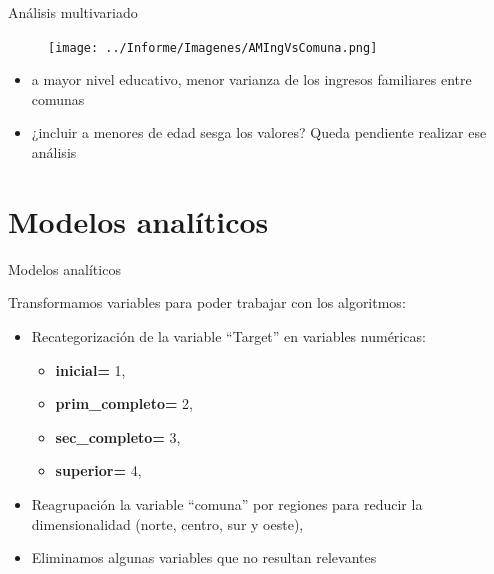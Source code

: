\documentclass[pdf]{beamer}
\def\vspace{}%
\begin{document}
{\begin{frame}{Análisis multivariado}
    \begin{minipage}{0.55\textwidth}
        \begin{figure} 
        \texttt{[image: ../Informe/Imagenes/AMIngVsComuna.png]}
        \end{figure}
    \end{minipage}
    \begin{minipage}{0.38\textwidth}
        \begin{itemize}
            \justifying%
            \item a mayor nivel educativo, menor varianza de los ingresos familiares entre comunas
            \item ¿incluir a menores de edad sesga los valores? Queda pendiente realizar ese análisis
        \end{itemize}
    \end{minipage}

\end{frame}

\section{Modelos analíticos}

\begin{frame}{Modelos analíticos}

    Transformamos variables para poder trabajar con los algoritmos:
    \begin{itemize}
        \item Recategorización de la variable ``Target'' en variables numéricas:
        \begin{itemize}
            \item \textbf{inicial=} 1,
            \item \textbf{prim\_completo=} 2,
            \item \textbf{sec\_completo=} 3,
            \item \textbf{superior=} 4,
        \end{itemize}
        \item Reagrupación la variable ``comuna'' por regiones para reducir la dimensionalidad (norte, centro, sur y oeste),
        \item Eliminamos algunas variables que no resultan relevantes 
    \end{itemize}
    

\end{frame}}
\end{document}
